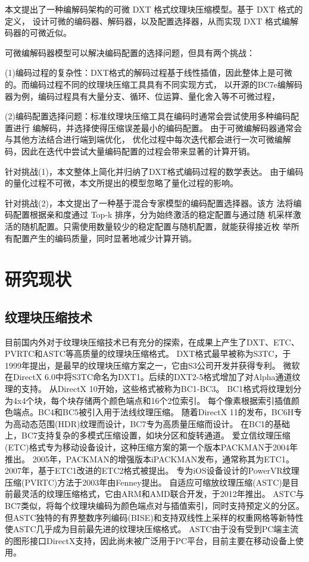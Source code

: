 本文提出了一种编解码架构的可微 DXT 格式纹理块压缩模型。基于 DXT 格式的定义，
设计可微的编码器、解码器，以及配置选择器，从而实现 DXT 格式编解码器的可微近似。

可微编解码器模型可以解决编码配置的选择问题，但具有两个挑战：

(1)编码过程的复杂性：DXT格式的解码过程基于线性插值，因此整体上是可微的。而编码过程不同的纹理块压缩工具具有不同实现方式，
以开源的BC7e编解码器为例，编码过程具有大量分支、循环、位运算、量化舍入等不可微过程，

(2)编码配置选择问题：标准纹理块压缩工具在编码时通常会尝试使用多种编码配置进行
编解码，并选择使得压缩误差最小的编码配置。
由于可微编解码器通常会与其他方法结合进行端到端优化，
优化过程中每次迭代都会进行一次可微编解码，因此在迭代中尝试大量编码配置的过程会带来显著的计算开销。

针对挑战(1)，本文整体上简化并归纳了DXT格式编码过程的数学表达。
由于编码的量化过程不可微，本文所提出的模型忽略了量化过程的影响。

针对挑战(2)，本文提出了一种基于混合专家模型的编码配置选择器。该方
法将编码配置根据亲和度通过 Top-k 排序，分为始终激活的稳定配置与通过随
机采样激活的随机配置。只需使用数量较少的稳定配置与随机配置，就能获得接近枚
举所有配置产生的编码质量，同时显著地减少计算开销。

\section{研究现状}

\subsection{纹理块压缩技术}
目前国内外对于纹理块压缩技术已有充分的探索，在成果上产生了DXT、ETC、PVRTC和ASTC等高质量的纹理块压缩格式。
DXT格式最早被称为S3TC\cite{iourcha1999system}，于1999年提出，是最早的纹理块压缩方案之一，它由S3公司开发并获得专利。
微软在DirectX 6.0中将S3TC命名为DXT1。后续的DXT2-5格式增加了对Alpha通道纹理的支持。
从DirectX 10开始，这些格式被称为BC1-BC3。
BC1格式将纹理划分为4x4个块，每个块存储两个颜色端点和16个2位索引。
每个像素根据索引插值颜色端点。BC4和BC5被引入用于法线纹理压缩。
随着DirectX 11的发布，BC6H专为高动态范围(HDR)纹理而设计，BC7专为高质量压缩而设计。
在BC1的基础上，BC7支持复杂的多模式压缩设置，如块分区和旋转通道。
爱立信纹理压缩(ETC)格式专为移动设备设计，这种压缩方案的第一个版本PACKMAN\cite{strom2004packman}于2004年推出。
2005年，PACKMAN的增强版本iPACKMAN\cite{strom2005packman}发布，通常称其为ETC1。
2007年，基于ETC1改进的ETC2\cite{strom2007etc}格式被提出。
专为iOS设备设计的PowerVR纹理压缩(PVRTC)方法于2003年由Fenney\cite{fenney2003texture}提出。
自适应可缩放纹理压缩(ASTC)\cite{nystad2012adaptive}是目前最灵活的纹理压缩格式，它由ARM和AMD联合开发，于2012年推出。
ASTC与BC7类似，将每个纹理块编码为颜色端点对与插值索引，同时支持预定义的分区。
但ASTC独特的有界整数序列编码(BISE)和支持双线性上采样的权重网格等新特性使ASTC几乎成为目前最先进的纹理块压缩格式。
ASTC由于没有受到PC端主流的图形接口DirectX支持，因此尚未被广泛用于PC平台，目前主要在移动设备上使用\cite{vaidyanathan2023random}。

